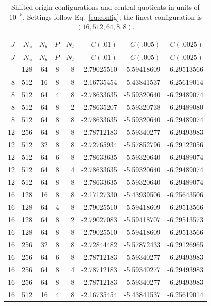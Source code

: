 \small
\begin{longtable}{rrrrrrrr}
\caption{Shifted-origin configurations and central quotients in units of $10^{-5}$. Settings follow Eq.~\eqref{eq:config}; the finest configuration is $(16,512,64,8,8)$.}\label{tab:configurations}\\
\toprule $J$ & $N_\omega$ & $N_\theta$ & $P$ & $N_t$ & $C(.01)$ & $C(.005)$ & $C(.0025)$\\\midrule\endfirsthead
\toprule $J$ & $N_\omega$ & $N_\theta$ & $P$ & $N_t$ & $C(.01)$ & $C(.005)$ & $C(.0025)$\\\midrule\endhead
\bottomrule\endfoot
8 & 128 & 64 & 8 & 8 & -2.79025510 & -5.59418609 & -6.29513566\\
8 & 512 & 16 & 8 & 8 & -2.16735454 & -5.43841537 & -6.25619014\\
8 & 512 & 64 & 4 & 8 & -2.78633635 & -5.59320640 & -6.29489074\\
8 & 512 & 64 & 8 & 2 & -2.78635207 & -5.59320738 & -6.29489080\\
8 & 512 & 64 & 8 & 8 & -2.78633635 & -5.59320640 & -6.29489074\\
12 & 256 & 64 & 8 & 8 & -2.78712183 & -5.59340277 & -6.29493983\\
12 & 512 & 32 & 8 & 8 & -2.72765934 & -5.57852796 & -6.29122056\\
12 & 512 & 64 & 6 & 8 & -2.78633635 & -5.59320640 & -6.29489074\\
12 & 512 & 64 & 8 & 4 & -2.78633635 & -5.59320640 & -6.29489074\\
12 & 512 & 64 & 8 & 8 & -2.78633635 & -5.59320640 & -6.29489074\\
16 & 128 & 16 & 8 & 8 & -2.17127330 & -5.43939506 & -6.25643506\\
16 & 128 & 64 & 4 & 8 & -2.79025510 & -5.59418609 & -6.29513566\\
16 & 128 & 64 & 8 & 2 & -2.79027083 & -5.59418707 & -6.29513573\\
16 & 128 & 64 & 8 & 8 & -2.79025510 & -5.59418609 & -6.29513566\\
16 & 256 & 32 & 8 & 8 & -2.72844482 & -5.57872433 & -6.29126965\\
16 & 256 & 64 & 6 & 8 & -2.78712183 & -5.59340277 & -6.29493983\\
16 & 256 & 64 & 8 & 4 & -2.78712183 & -5.59340277 & -6.29493983\\
16 & 256 & 64 & 8 & 8 & -2.78712183 & -5.59340277 & -6.29493983\\
16 & 512 & 16 & 4 & 8 & -2.16735454 & -5.43841537 & -6.25619014\\

\end{longtable}
